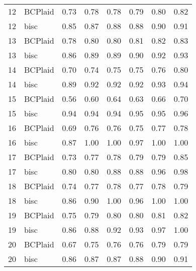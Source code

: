 \begin{table}[ht]
\begin{tabular}{rlrrrrrr}
   12 & BCPlaid & 0.73 & 0.78 & 0.78 & 0.79 & 0.80 & 0.82 \\ 
   12 & bisc & 0.85 & 0.87 & 0.88 & 0.88 & 0.90 & 0.91 \\ 
   13 & BCPlaid & 0.78 & 0.80 & 0.80 & 0.81 & 0.82 & 0.83 \\ 
   13 & bisc & 0.86 & 0.89 & 0.89 & 0.90 & 0.92 & 0.93 \\ 
   14 & BCPlaid & 0.70 & 0.74 & 0.75 & 0.75 & 0.76 & 0.80 \\ 
   14 & bisc & 0.89 & 0.92 & 0.92 & 0.92 & 0.93 & 0.94 \\ 
   15 & BCPlaid & 0.56 & 0.60 & 0.64 & 0.63 & 0.66 & 0.70 \\ 
   15 & bisc & 0.94 & 0.94 & 0.94 & 0.95 & 0.95 & 0.96 \\ 
   16 & BCPlaid & 0.69 & 0.76 & 0.76 & 0.75 & 0.77 & 0.78 \\ 
   16 & bisc & 0.87 & 1.00 & 1.00 & 0.97 & 1.00 & 1.00 \\ 
   17 & BCPlaid & 0.73 & 0.77 & 0.78 & 0.79 & 0.79 & 0.85 \\ 
   17 & bisc & 0.80 & 0.80 & 0.88 & 0.88 & 0.96 & 0.98 \\ 
   18 & BCPlaid & 0.74 & 0.77 & 0.78 & 0.77 & 0.78 & 0.79 \\ 
   18 & bisc & 0.86 & 0.90 & 1.00 & 0.96 & 1.00 & 1.00 \\ 
   19 & BCPlaid & 0.75 & 0.79 & 0.80 & 0.80 & 0.81 & 0.82 \\ 
   19 & bisc & 0.86 & 0.88 & 0.92 & 0.93 & 0.97 & 1.00 \\ 
   20 & BCPlaid & 0.67 & 0.75 & 0.76 & 0.76 & 0.79 & 0.79 \\ 
   20 & bisc & 0.86 & 0.87 & 0.87 & 0.88 & 0.90 & 0.91 \\ 
   \bottomrule
\end{tabular}
\end{table}
